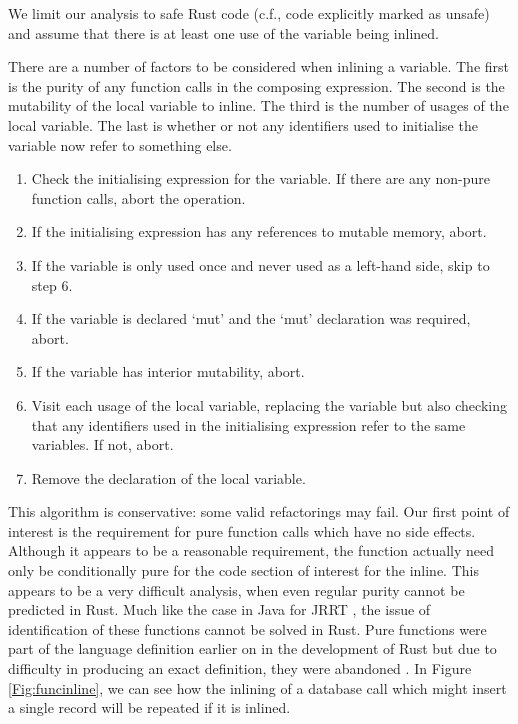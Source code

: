 We limit our analysis to safe Rust code (c.f., code explicitly marked as unsafe) and assume that there is at least one use of the variable being inlined.

There are a number of factors to be considered when inlining a variable. The first is the purity of any function calls in the composing expression. The second is the mutability of the local variable to inline. The third is the number of usages of the local variable. The last is whether or not any identifiers used to initialise the variable now refer to something else.

\begin{enumerate} 
\item Check the initialising expression for the variable. If there are any non-pure function calls, abort the operation.
\item If the initialising expression has any references to mutable memory, abort.
\item If the variable is only used once and never used as a left-hand side, skip to step 6.
\item If the variable is declared `mut' and the `mut' declaration was required, abort.
\item If the variable has interior mutability, abort.
\item Visit each usage of the local variable, replacing the variable but also checking that any identifiers used in the initialising expression refer to the same variables. If not, abort.
\item Remove the declaration of the local variable.
\end{enumerate}

This algorithm is conservative: some valid refactorings may fail. Our first point of interest is the requirement for pure function calls which have no side effects. Although it appears to be a reasonable requirement, the function actually need only be conditionally pure for the code section of interest for the inline. This appears to be a very difficult analysis, when even regular purity cannot be predicted in Rust. Much like the case in Java for JRRT \cite{schafer2010specification}, the issue of identification of these functions cannot be solved in Rust. Pure functions were part of the language definition earlier on in the development of Rust but due to difficulty in producing an exact definition, they were abandoned \cite{pwalton}. In Figure \ref{Fig:funcinline}, we can see how the inlining of a database call which might insert a single record will be repeated if it is inlined.

